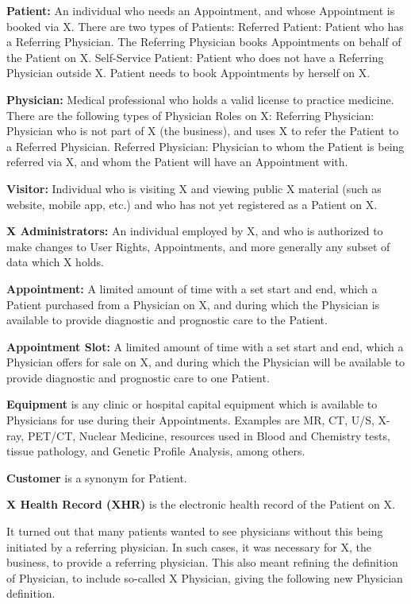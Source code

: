 \documentclass[graybox,envcountchap,sectrefs]{svmono}
\begin{document}
\begin{svgraybox}
\noindent\textbf{Patient:} An individual who needs an Appointment, and whose Appointment is booked via X. There are two types of Patients:
Referred Patient: Patient who has a Referring Physician. The Referring Physician books Appointments on behalf of the Patient on X.
Self-Service Patient: Patient who does not have a Referring Physician outside X. Patient needs to book Appointments by herself on X.

\noindent\textbf{Physician:} Medical professional who holds a valid license to practice medicine. There are the following types of Physician Roles on X:
Referring Physician: Physician who is not part of X (the business), and uses X to refer the Patient to a Referred Physician.
Referred Physician: Physician to whom the Patient is being referred via X, and whom the Patient will have an Appointment with. 

\noindent\textbf{Visitor:} Individual who is visiting X and viewing public X material (such as website, mobile app, etc.) and who has not yet registered as a Patient on X.

\noindent\textbf{X Administrators:} An individual employed by X, and who is authorized to make changes to User Rights, Appointments, and more generally any subset of data which X holds.

\noindent\textbf{Appointment:} A limited amount of time with a set start and end, which a Patient purchased from a Physician on X, and during which the Physician is available to provide diagnostic and prognostic care to the Patient.

\noindent\textbf{Appointment Slot:} A limited amount of time with a set start and end, which a Physician offers for sale on X, and during which the Physician will be available to provide diagnostic and prognostic care to one Patient.

\noindent\textbf{Equipment} is any clinic or hospital capital equipment which is available to Physicians for use during their Appointments. Examples are MR, CT, U/S, X-ray, PET/CT, Nuclear Medicine, resources used in Blood and Chemistry tests, tissue pathology, and Genetic Profile Analysis, among others.

\noindent\textbf{Customer} is a synonym for Patient.

\noindent\textbf{X Health Record (XHR)} is the electronic health record of the Patient on X.
\end{svgraybox}

It turned out that many patients wanted to see physicians without this being initiated by a referring physician. In such cases, it was necessary for X, the business, to provide a referring physician. This also meant refining the definition of Physician, to include so-called X Physician, giving the following new Physician definition.
\end{document}
